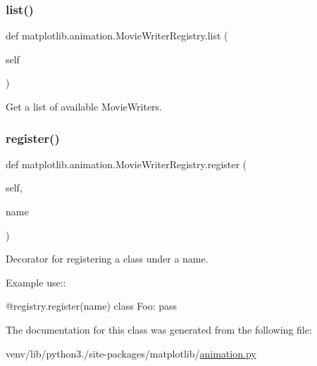 \subsubsection{\texorpdfstring{list()}{list()}}
{\footnotesize\ttfamily def matplotlib.\+animation.\+Movie\+Writer\+Registry.\+list (\begin{DoxyParamCaption}\item[{}]{self }\end{DoxyParamCaption})}

\begin{DoxyVerb}Get a list of available MovieWriters.\end{DoxyVerb}
 \mbox{\label{classmatplotlib_1_1animation_1_1MovieWriterRegistry_ac12f67f0bba571be8edddca11a9a7dc7}} 
\subsubsection{\texorpdfstring{register()}{register()}}
{\footnotesize\ttfamily def matplotlib.\+animation.\+Movie\+Writer\+Registry.\+register (\begin{DoxyParamCaption}\item[{}]{self,  }\item[{}]{name }\end{DoxyParamCaption})}

\begin{DoxyVerb}Decorator for registering a class under a name.

Example use::

    @registry.register(name)
    class Foo:
pass
\end{DoxyVerb}
 

The documentation for this class was generated from the following file\+:\begin{DoxyCompactItemize}
\item 
venv/lib/python3./site-\/packages/matplotlib/\hyperlink{animation_8py}{animation.\+py}\end{DoxyCompactItemize}
